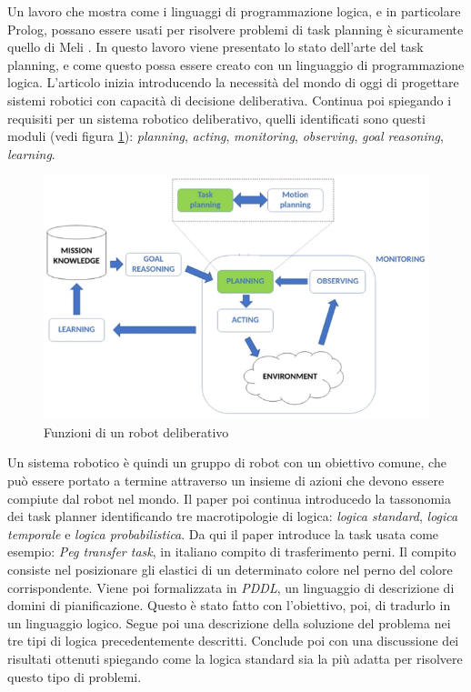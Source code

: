 Un lavoro che mostra come i linguaggi di programmazione logica, e in particolare Prolog, possano essere usati per risolvere problemi di task planning è sicuramente quello di Meli \cite{meli2023logic}. In questo lavoro viene presentato lo stato dell'arte del task planning, e come questo possa essere creato con un linguaggio di programmazione logica.
L'articolo inizia introducendo la necessità del mondo di oggi di progettare sistemi robotici con capacità di decisione deliberativa. 
Continua poi spiegando i requisiti per un sistema robotico deliberativo, quelli identificati sono questi moduli (vedi figura \ref{fig:delrob}): 
    \textit{planning},
    \textit{acting},
    \textit{monitoring},
    \textit{observing},
    \textit{goal reasoning},
    \textit{learning}.
\begin{figure}[h!]
    \centering
    \includegraphics[scale=0.55]{images/deliberativerobot.png}
    \caption{Funzioni di un robot deliberativo \cite{meli2023logic}}
    \label{fig:delrob}
\end{figure}
Un sistema robotico è quindi un gruppo di robot con un obiettivo comune, che può essere portato a termine attraverso un insieme di azioni che devono essere compiute dal robot nel mondo.
Il paper poi continua introducedo la tassonomia dei task planner identificando tre macrotipologie di logica: \textit{logica standard}, \textit{logica temporale} e \textit{logica probabilistica}.
Da qui il paper introduce la task usata come esempio: \textit{Peg transfer task}, in italiano compito di trasferimento perni.
Il compito consiste nel posizionare gli elastici di un determinato colore nel perno del colore corrispondente.
Viene poi formalizzata in \textit{PDDL}, un linguaggio di descrizione di domini di pianificazione. Questo è stato fatto con l'obiettivo, poi, di tradurlo in un linguaggio logico.
Segue poi una descrizione della soluzione del problema nei tre tipi di logica precedentemente descritti. Conclude poi con una discussione dei risultati ottenuti spiegando come la logica standard sia la più adatta per risolvere questo tipo di problemi.


